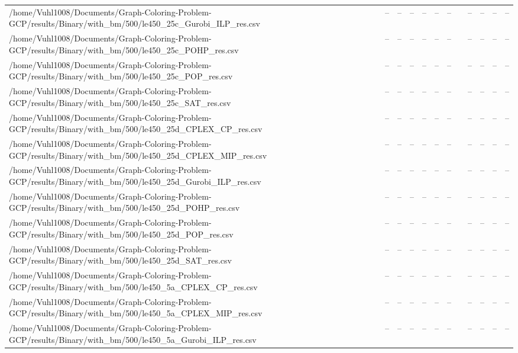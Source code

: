 \begin{table}[htbp]
\begin{tabular}{llllllllllll}
/home/Vuhl1008/Documents/Graph-Coloring-Problem-GCP/results/Binary/with\_bm/500/le450\_25c\_Gurobi\_ILP\_res.csv & -- & -- & -- & -- & -- & -- & {} & -- & -- & -- & -- \\
/home/Vuhl1008/Documents/Graph-Coloring-Problem-GCP/results/Binary/with\_bm/500/le450\_25c\_POHP\_res.csv & -- & -- & -- & -- & -- & -- & {} & -- & -- & -- & -- \\
/home/Vuhl1008/Documents/Graph-Coloring-Problem-GCP/results/Binary/with\_bm/500/le450\_25c\_POP\_res.csv & -- & -- & -- & -- & -- & -- & {} & -- & -- & -- & -- \\
/home/Vuhl1008/Documents/Graph-Coloring-Problem-GCP/results/Binary/with\_bm/500/le450\_25c\_SAT\_res.csv & -- & -- & -- & -- & -- & -- & {} & -- & -- & -- & -- \\
/home/Vuhl1008/Documents/Graph-Coloring-Problem-GCP/results/Binary/with\_bm/500/le450\_25d\_CPLEX\_CP\_res.csv & -- & -- & -- & -- & -- & -- & {} & -- & -- & -- & -- \\
/home/Vuhl1008/Documents/Graph-Coloring-Problem-GCP/results/Binary/with\_bm/500/le450\_25d\_CPLEX\_MIP\_res.csv & -- & -- & -- & -- & -- & -- & {} & -- & -- & -- & -- \\
/home/Vuhl1008/Documents/Graph-Coloring-Problem-GCP/results/Binary/with\_bm/500/le450\_25d\_Gurobi\_ILP\_res.csv & -- & -- & -- & -- & -- & -- & {} & -- & -- & -- & -- \\
/home/Vuhl1008/Documents/Graph-Coloring-Problem-GCP/results/Binary/with\_bm/500/le450\_25d\_POHP\_res.csv & -- & -- & -- & -- & -- & -- & {} & -- & -- & -- & -- \\
/home/Vuhl1008/Documents/Graph-Coloring-Problem-GCP/results/Binary/with\_bm/500/le450\_25d\_POP\_res.csv & -- & -- & -- & -- & -- & -- & {} & -- & -- & -- & -- \\
/home/Vuhl1008/Documents/Graph-Coloring-Problem-GCP/results/Binary/with\_bm/500/le450\_25d\_SAT\_res.csv & -- & -- & -- & -- & -- & -- & {} & -- & -- & -- & -- \\
/home/Vuhl1008/Documents/Graph-Coloring-Problem-GCP/results/Binary/with\_bm/500/le450\_5a\_CPLEX\_CP\_res.csv & -- & -- & -- & -- & -- & -- & {} & -- & -- & -- & -- \\
/home/Vuhl1008/Documents/Graph-Coloring-Problem-GCP/results/Binary/with\_bm/500/le450\_5a\_CPLEX\_MIP\_res.csv & -- & -- & -- & -- & -- & -- & {} & -- & -- & -- & -- \\
/home/Vuhl1008/Documents/Graph-Coloring-Problem-GCP/results/Binary/with\_bm/500/le450\_5a\_Gurobi\_ILP\_res.csv & -- & -- & -- & -- & -- & -- & {} & -- & -- & -- & -- \\

\end{tabular}
\end{table}
